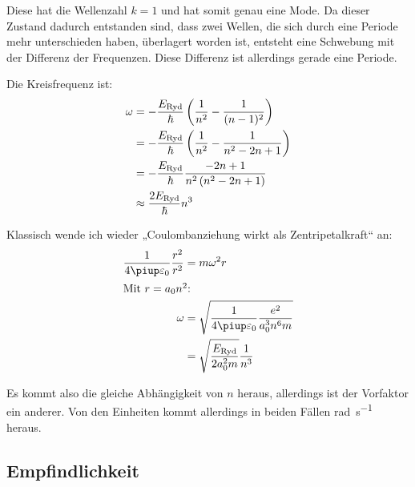 Diese hat die Wellenzahl $k = 1$ und hat somit genau eine Mode. Da dieser
Zustand dadurch entstanden sind, dass zwei Wellen, die sich durch eine Periode
mehr unterschieden haben, überlagert worden ist, entsteht eine Schwebung mit
der Differenz der Frequenzen. Diese Differenz ist allerdings gerade eine
Periode.

Die Kreisfrequenz ist:
\begin{align*}
	\omega
	&= - \frac{E_\text{Ryd}}\hbar \del{\frac1{n^2} - \frac1{(n-1)^2}} \\
	&= - \frac{E_\text{Ryd}}\hbar \del{\frac1{n^2} - \frac1{n^2 - 2n + 1}} \\
	&= - \frac{E_\text{Ryd}}\hbar \frac{-2n + 1}{n^2 \del{n^2 - 2n + 1}} \\
	&\approx \frac{2E_\text{Ryd}}\hbar {n^3} \\
\end{align*}

Klassisch wende ich wieder „Coulombanziehung wirkt als Zentripetalkraft“ an:
\begin{align*}
	\frac{1}{4\piup \varepsilon_0} \frac{r^2}{r^2} &= m \omega^2 r \\
	\intertext{%
		Mit $r = a_0 n^2$:
	}
	\omega &= \sqrt{\frac{1}{4\piup \varepsilon_0} \frac{e^2}{a_0^3 n^6 m}} \\
					   &= \sqrt{\frac{E_\text{Ryd}}{2a_0^2m}} \frac{1}{n^3}
\end{align*}

Es kommt also die gleiche Abhängigkeit von $n$ heraus, allerdings ist der
Vorfaktor ein anderer. Von den Einheiten kommt allerdings in beiden Fällen
\si{\radian\per\second} heraus.

\fehlt

\subsection{Empfindlichkeit}

\fehlt


\IfFileExists{\bibliographyfile}{
}{}



